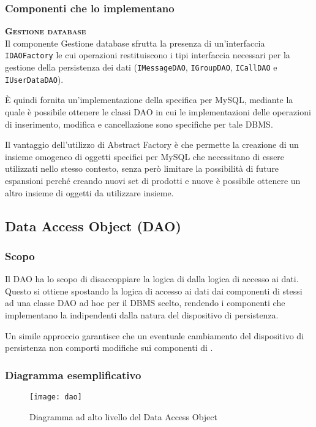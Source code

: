 \subsubsection{Componenti che lo implementano}
\begin{description}
  \item{\bfseries\scshape Gestione database}\\
Il componente Gestione database sfrutta la presenza di un'interfaccia \texttt{IDAOFactory} le cui operazioni restituiscono i tipi interfaccia necessari per la gestione della persistenza dei dati (\texttt{IMessageDAO}, \texttt{IGroupDAO}, \texttt{ICallDAO} e \texttt{IUserDataDAO}).

È quindi fornita un'implementazione della  specifica per MySQL, mediante la quale è possibile ottenere le classi DAO in cui le implementazioni delle operazioni di inserimento, modifica e cancellazione sono specifiche per tale DBMS\@.

Il vantaggio dell'utilizzo di Abstract Factory è che permette la creazione di un insieme omogeneo di oggetti specifici per MySQL che necessitano di essere utilizzati nello stesso contesto, senza però limitare la possibilità di future espansioni perché creando nuovi set di prodotti e nuove  è possibile ottenere un altro insieme di oggetti da utilizzare insieme.
\end{description}

\subsection{Data Access Object (DAO)}

\subsubsection{Scopo}
Il  DAO ha lo scopo di disaccoppiare la logica di  dalla logica di accesso ai dati. Questo si ottiene spostando la logica di accesso ai dati dai componenti di  stessi ad una classe DAO ad hoc per il DBMS scelto, rendendo i componenti che implementano la  indipendenti dalla natura del dispositivo di persistenza.

Un simile approccio garantisce che un eventuale cambiamento del dispositivo di persistenza non comporti modifiche sui componenti di .

\subsubsection{Diagramma esemplificativo}
  \begin{figure}[H]
  \centering
  \texttt{[image: dao]}
  \caption{Diagramma ad alto livello del  Data Access Object}\label{fig:dao}
\end{figure}

